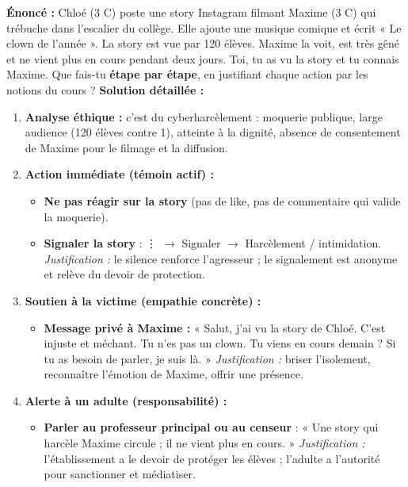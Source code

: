 \documentclass[11pt]{article}
\newcommand{\cle}[1]{{\popxbold\color{popdark}#1}}
\begin{document}
\begin{exoresolu}
\textbf{Énoncé :} Chloé (3 C) poste une story Instagram filmant Maxime (3 C) qui trébuche dans l'escalier du collège. Elle ajoute une musique comique et écrit « Le clown de l'année ». La story est vue par 120 élèves. Maxime la voit, est très gêné et ne vient plus en cours pendant deux jours. Toi, tu as vu la story et tu connais Maxime. Que fais-tu \textbf{étape par étape}, en justifiant chaque action par les notions du cours ?
\tcblower
\textbf{Solution détaillée :}
\begin{enumerate}
    \item \textbf{Analyse éthique :} c'est du \cle{cyberharcèlement} : moquerie publique, large audience (120 élèves contre 1), atteinte à la dignité, absence de consentement de Maxime pour le filmage et la diffusion.
    \item \textbf{Action immédiate (témoin actif) :}
        \begin{itemize}
            \item \textbf{Ne pas réagir sur la story} (pas de like, pas de commentaire qui valide la moquerie).
            \item \textbf{Signaler la story} : ⋮ $\rightarrow$ Signaler $\rightarrow$ Harcèlement / intimidation. \emph{Justification :} le silence renforce l'agresseur ; le signalement est anonyme et relève du devoir de protection.
        \end{itemize}
    \item \textbf{Soutien à la victime (empathie concrète) :}
        \begin{itemize}
            \item \textbf{Message privé à Maxime :} « Salut, j'ai vu la story de Chloé. C'est injuste et méchant. Tu n'es pas un clown. Tu viens en cours demain ? Si tu as besoin de parler, je suis là. » \emph{Justification :} briser l'isolement, reconnaître l'émotion de Maxime, offrir une présence.
        \end{itemize}
    \item \textbf{Alerte à un adulte (responsabilité) :}
        \begin{itemize}
            \item \textbf{Parler au professeur principal ou au censeur} : « Une story qui harcèle Maxime circule ; il ne vient plus en cours. » \emph{Justification :} l'établissement a le devoir de protéger les élèves ; l'adulte a l'autorité pour sanctionner et médiatiser.
        \end{itemize}

\end{enumerate}
\end{exoresolu}
\end{document}
